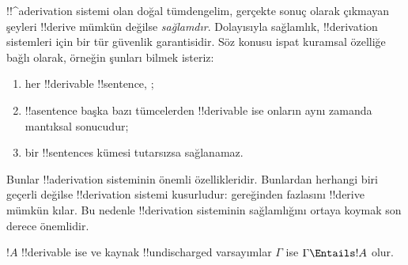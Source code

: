 \documentclass[../../../include/open-logic-section]{subfiles}
\begin{document}
      {}
      {}
      

\begin{explain}
!!^a{derivation} sistemi olan doğal tümdengelim, gerçekte sonuç olarak
çıkmayan şeyleri !!{derive} mümkün değilse \emph{sağlamdır}. Dolayısıyla
sağlamlık, !!{derivation} sistemleri için bir tür güvenlik garantisidir. Söz
konusu ispat kuramsal özelliğe bağlı olarak, örneğin şunları bilmek isteriz:
\begin{enumerate}
\item her !!{derivable} !!{sentence}, ;
\item !!a{sentence} başka bazı tümcelerden !!{derivable} ise onların aynı
  zamanda mantıksal sonucudur;
\item bir !!{sentence}s kümesi tutarsızsa sağlanamaz.
\end{enumerate}
Bunlar !!a{derivation} sisteminin önemli özellikleridir. Bunlardan herhangi
biri geçerli değilse !!{derivation} sistemi kusurludur: gereğinden fazlasını
!!{derive} mümkün kılar. Bu nedenle !!{derivation} sisteminin sağlamlığını ortaya
koymak son derece önemlidir.
\end{explain}

\begin{thm}[Sağlamlık]
$!A$ !!{derivable} ise ve kaynak !!{undischarged} varsayımlar $\Gamma$ ise
$\Gamma \Entails !A$ olur.
\end{thm}
\end{document}
